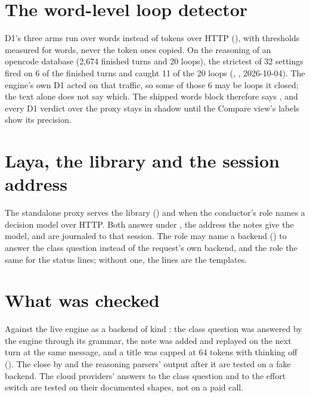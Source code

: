 \section{The word-level loop detector}

D1's three arms run over words instead of tokens over HTTP (), with thresholds measured for words, never the token ones copied. On the reasoning of an opencode database (2,674 finished turns and 20 loops), the strictest of 32 settings fired on 6 of the finished turns and caught 11 of the 20 loops (\measured, , 2026-10-04). The engine's own D1 acted on that traffic, so some of those 6 may be loops it closed; the text alone does not say which. The shipped words block therefore says , and every D1 verdict over the proxy stays in shadow until the Compare view's labels show its precision.

\section{Laya, the library and the session address}

The standalone proxy serves the library () and  when the conductor's  role names a decision model over HTTP. Both answer under , the address the notes give the model, and are journaled to that session. The  role may name a backend () to answer the class question instead of the request's own backend, and the  role the same for the status lines; without one, the lines are the templates.

\section{What was checked}

Against the live engine as a backend of kind : the class question was answered by the engine through its grammar, the note was added and replayed on the next turn at the same message, and a title was capped at 64 tokens with thinking off (). The close by  and the reasoning parsers' output after it are tested on a fake backend. The cloud providers' answers to the class question and to the effort switch are tested on their documented shapes, not on a paid call.
